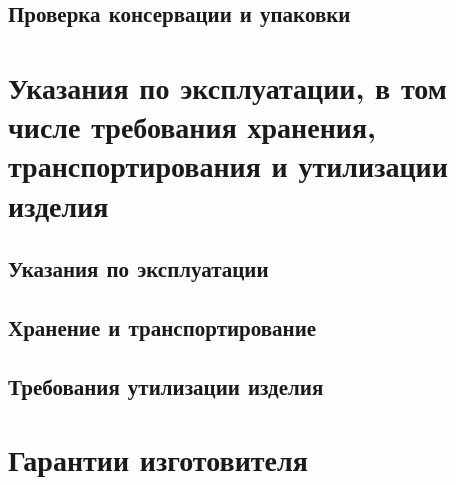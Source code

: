 \documentclass[columnsxxiv,columnsxxvii,pointsubsection]{eskdtext}
\begin{document}
%	
	
	\subsection{Проверка консервации и упаковки}
	\label{m_up}
	\point
	\label{m_up1}
	
	\point
	\label{m_up2}
	
%	
	
	\newpage
	\section{Указания по эксплуатации, в том числе требования хранения, транспортирования и утилизации изделия}
	
	\subsection{Указания по эксплуатации}
	\label{expl}	
		
	
	\subsection{Хранение и транспортирование}
	\label{transp}
	

	\subsection{Требования утилизации изделия}
	\label{util}	
	
	
	\section{Гарантии изготовителя}
	\label{gp}
	

	\label{prav_pre}
	
	\label{axes}
	
	\label{equip}
	
	
	\newpage
	
\end{document}

